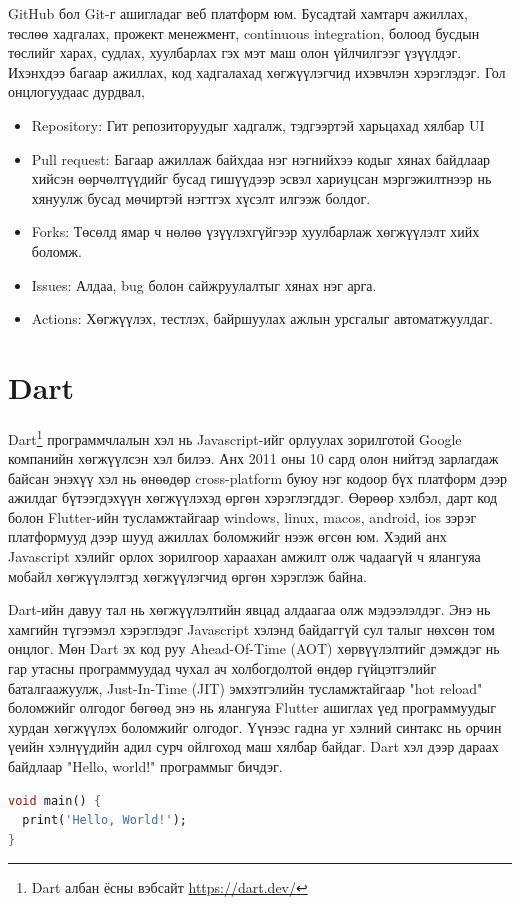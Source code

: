 GitHub бол Git-г ашигладаг веб платформ юм. Бусадтай хамтарч ажиллах, төслөө хадгалах, прожект менежмент, continuous integration, болоод бусдын төслийг харах, судлах, хуулбарлах гэх мэт маш олон үйлчилгээг үзүүлдэг. Ихэнхдээ багаар ажиллах, код хадгалахад хөгжүүлэгчид ихэвчлэн хэрэглэдэг. Гол онцлогуудаас дурдвал,
\begin{itemize}
    \item Repository: Гит репозиторуудыг хадгалж, тэдгээртэй харьцахад хялбар UI
    \item Pull request: Багаар ажиллаж байхдаа нэг нэгнийхээ кодыг хянах байдлаар хийсэн өөрчөлтүүдийг бусад гишүүдээр эсвэл хариуцсан мэргэжилтнээр нь хянуулж бусад мөчиртэй нэгтгэх хүсэлт илгээж болдог.
    \item Forks: Төсөлд ямар ч нөлөө үзүүлэхгүйгээр хуулбарлаж хөгжүүлэлт хийх боломж.
    \item Issues: Алдаа, bug болон сайжруулалтыг хянах нэг арга.
    \item Actions: Хөгжүүлэх, тестлэх, байршуулах ажлын урсгалыг автоматжуулдаг.
\end{itemize}
\section{Dart}
Dart\footnote{Dart албан ёсны вэбсайт \url{https://dart.dev/}} программчлалын хэл нь Javascript-ийг орлуулах зорилготой Google компанийн хөгжүүлсэн хэл билээ. Анх 2011 оны 10 сард олон нийтэд зарлагдаж байсан энэхүү хэл нь өнөөдөр cross-platform буюу нэг кодоор бүх платформ дээр ажилдаг бүтээгдэхүүн хөгжүүлэхэд өргөн хэрэглэгддэг. Өөрөөр хэлбэл, дарт код болон Flutter-ийн тусламжтайгаар windows, linux, macos, android, ios зэрэг платформууд дээр шууд ажиллах боломжийг нээж өгсөн юм. Хэдий анх Javascript хэлийг орлох зорилгоор хараахан амжилт олж чадаагүй ч ялангуяа мобайл хөгжүүлэлтэд хөгжүүлэгчид өргөн хэрэглэж байна.

Dart-ийн давуу тал нь хөгжүүлэлтийн явцад алдаагаа олж мэдээлэлдэг. Энэ нь хамгийн түгээмэл хэрэглэдэг Javascript хэлэнд байдаггүй сул талыг нөхсөн том онцлог. Мөн Dart эх код руу Ahead-Of-Time (AOT) хөрвүүлэлтийг дэмждэг нь гар утасны программуудад чухал ач холбогдолтой өндөр гүйцэтгэлийг баталгаажуулж, Just-In-Time (JIT) эмхэтгэлийн тусламжтайгаар "hot reload" боломжийг олгодог бөгөөд энэ нь ялангуяа Flutter ашиглах үед программуудыг хурдан хөгжүүлэх боломжийг олгодог. Үүнээс гадна уг хэлний синтакс нь орчин үеийн хэлнүүдийн адил сурч ойлгоход маш хялбар байдаг.
Dart хэл дээр дараах байдлаар "Hello, world!" программыг бичдэг.
\begin{lstlisting}[language=Dart, caption=Dart хэл дээрх анхны программ бичилтийн синтакс, frame=single]
void main() {
  print('Hello, World!');
}
\end{lstlisting}

